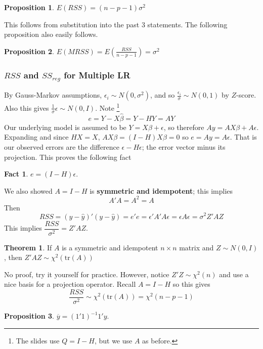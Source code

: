 \documentclass[12pt, a4paper]{article}
\theoremstyle{definition}
\newtheorem{thm}{Theorem}
\newtheorem{proposition}{Proposition}
\newtheorem{fact}{Fact}
\newcommand{\eps}{\epsilon}
\newcommand{\ol}{\overline}
\newcommand{\f}{\frac}
\newcommand{\df}{\dfrac}
\newcommand{\tr}{\mathrm{tr}}
\begin{document}
		\begin{proposition}
			$E(RSS) = (n-p-1)\sigma^2$
		\end{proposition}
	
		This follows from substitution into the past 3 statements. The following proposition also easily follows.
		
		\begin{proposition}
			$E(MRSS) = E(\f{RSS}{n-p-1}) = \sigma^2$
		\end{proposition}
		
		\subsubsection{$RSS$ and $SS_{reg}$ for Multiple LR} 
		
		By Gauss-Markov assumptions, $\eps_i \sim N(0, \sigma^2)$, and so $\f{\eps_i}{\sigma} \sim N(0,1)$ by $Z$-score. Also this gives $\f{1}{\sigma} \eps \sim N(0, I)$. Note	\footnote{The slides use $Q = I - H$, but we use $A$ as before.}	
		$$e = Y - X \hat\beta = Y - HY = AY$$ 
		Our underlying model is assumed to be $Y = X\beta + \eps$, so therefore $Ay = AX\beta + A\eps$. Expanding and since $HX = X$, 
		$
		AX\beta = (I - H) X \beta = 0
		$ 
		so $e = Ay = A \eps$. That is our observed errors are the difference $\eps - H\eps$; the error vector minus its projection. This proves the following fact
		
		\begin{fact}
			$e = (I - H) \eps$.
		\end{fact}
		
		We also showed $A = I-H$ is {\bf symmetric and idempotent}; this implies 
			$$A'A = A^2 = A$$
		Then 
		$$
			RSS = (y - \hat y)'(y - \hat y) =  e'e = \eps' A' A \eps = \eps A \eps  = \sigma^2 Z'AZ
		$$
		This implies $\df{RSS}{\sigma^2} = Z'AZ$.
		
		\begin{thm}
			If $A$ is a symmetric and idempotent $n \times n$ matrix and $Z \sim N(0, I)$, then $Z'AZ \sim \chi^2(\tr(A))$
		\end{thm}
			
		No proof, try it yourself for practice. However, notice $Z'Z \sim \chi^2(n)$ and use a nice basis for a projection operator. Recall $A = I-H$ so this gives 
		$$\df{RSS}{\sigma^2} \sim \chi^2(\tr(A)) = \chi^2(n-p-1)$$
	
		\begin{proposition}
			$\ol y = (1'1)^{-1} 1' y$.
		\end{proposition}
		
\end{document}
